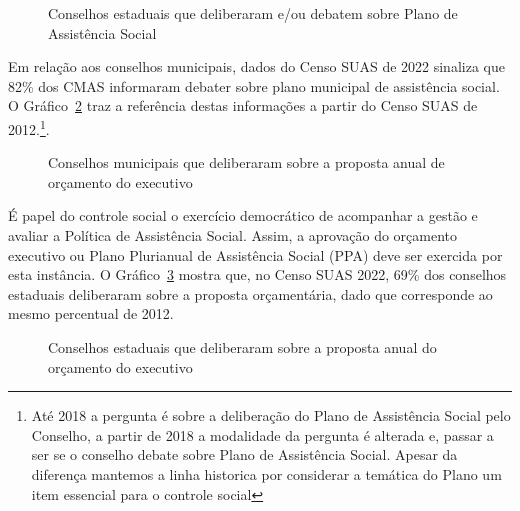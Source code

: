 \documentclass[
  letterpaper,
  DIV=11,
  numbers=noendperiod]{scrreprt}
\begin{document}
\begin{figure}


\caption{\label{fig-ceas_plano}Conselhos estaduais que deliberaram e/ou
debatem sobre Plano de Assistência Social}

\end{figure}%

Em relação aos conselhos municipais, dados do Censo SUAS de 2022
sinaliza que 82\% dos CMAS informaram debater sobre plano municipal de
assistência social. O Gráfico~\ref{fig-cmas_plano} traz a referência
destas informações a partir do Censo SUAS de 2012.\footnote{Até 2018 a
  pergunta é sobre a deliberação do Plano de Assistência Social pelo
  Conselho, a partir de 2018 a modalidade da pergunta é alterada e,
  passar a ser se o conselho debate sobre Plano de Assistência Social.
  Apesar da diferença mantemos a linha historica por considerar a
  temática do Plano um item essencial para o controle social}.

\begin{figure}


\caption{\label{fig-cmas_plano}Conselhos municipais que deliberaram
sobre a proposta anual de orçamento do executivo}

\end{figure}%

É papel do controle social o exercício democrático de acompanhar a
gestão e avaliar a Política de Assistência Social. Assim, a aprovação do
orçamento executivo ou Plano Plurianual de Assistência Social (PPA) deve
ser exercida por esta instância. O Gráfico~\ref{fig-ceas_ppa} mostra
que, no Censo SUAS 2022, 69\% dos conselhos estaduais deliberaram sobre
a proposta orçamentária, dado que corresponde ao mesmo percentual de
2012.

\begin{figure}


\caption{\label{fig-ceas_ppa}Conselhos estaduais que deliberaram sobre a
proposta anual do orçamento do executivo}

\end{figure}%
\end{document}
